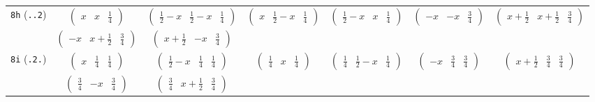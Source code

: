 \documentclass[fleqn,9pt,landscape]{jsarticle}
\begin{document}
\begin{center}
\begin{longtable}{ccccccc}
{\tt 8h} ({\tt ..2}) & $ \begin{pmatrix} x & x & \frac{1}{4} \end{pmatrix} $ & $ \begin{pmatrix} \frac{1}{2} - x & \frac{1}{2} - x & \frac{1}{4} \end{pmatrix} $ & $ \begin{pmatrix} x & \frac{1}{2} - x & \frac{1}{4} \end{pmatrix} $ & $ \begin{pmatrix} \frac{1}{2} - x & x & \frac{1}{4} \end{pmatrix} $ & $ \begin{pmatrix} - x & - x & \frac{3}{4} \end{pmatrix} $ & $ \begin{pmatrix} x + \frac{1}{2} & x + \frac{1}{2} & \frac{3}{4} \end{pmatrix} $ \\
& $ \begin{pmatrix} - x & x + \frac{1}{2} & \frac{3}{4} \end{pmatrix} $ & $ \begin{pmatrix} x + \frac{1}{2} & - x & \frac{3}{4} \end{pmatrix} $ & $  $ & $  $ & $  $ & $  $ \\ \hline
{\tt 8i} ({\tt .2.}) & $ \begin{pmatrix} x & \frac{1}{4} & \frac{1}{4} \end{pmatrix} $ & $ \begin{pmatrix} \frac{1}{2} - x & \frac{1}{4} & \frac{1}{4} \end{pmatrix} $ & $ \begin{pmatrix} \frac{1}{4} & x & \frac{1}{4} \end{pmatrix} $ & $ \begin{pmatrix} \frac{1}{4} & \frac{1}{2} - x & \frac{1}{4} \end{pmatrix} $ & $ \begin{pmatrix} - x & \frac{3}{4} & \frac{3}{4} \end{pmatrix} $ & $ \begin{pmatrix} x + \frac{1}{2} & \frac{3}{4} & \frac{3}{4} \end{pmatrix} $ \\
& $ \begin{pmatrix} \frac{3}{4} & - x & \frac{3}{4} \end{pmatrix} $ & $ \begin{pmatrix} \frac{3}{4} & x + \frac{1}{2} & \frac{3}{4} \end{pmatrix} $ & $  $ & $  $ & $  $ & $  $ \\ \hline

\end{longtable}
\end{center}
\end{document}
